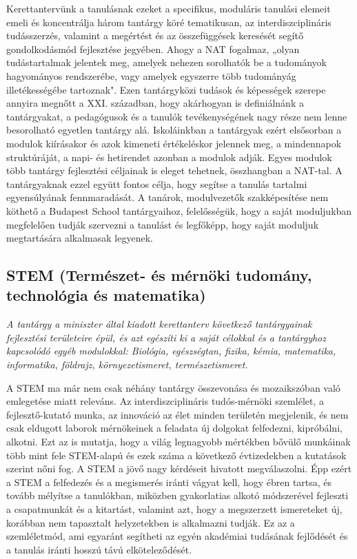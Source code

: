 Kerettantervünk a tanulásnak ezeket a specifikus, moduláris tanulási elemeit emeli és koncentrálja három tantárgy köré tematikusan, az interdiszciplináris tudásszerzés, valamint a megértést és az összefüggések keresését segítő gondolkodásmód fejlesztése jegyében. Ahogy a NAT fogalmaz, „olyan tudástartalmak jelentek meg, amelyek nehezen sorolhatók be a tudományok hagyományos rendszerébe, vagy amelyek egyszerre több tudományág illetékességébe tartoznak". Ezen tantárgyközi tudások és képességek szerepe annyira megnőtt a XXI. században, hogy akárhogyan is definiálnánk a tantárgyakat, a pedagógusok és a tanulók tevékenységének nagy része nem lenne besorolható egyetlen tantárgy alá. Iskoláinkban a tantárgyak ezért elsősorban a modulok kiírásakor és azok kimeneti értékeléskor jelennek meg, a mindennapok struktúráját, a napi- és hetirendet azonban a modulok adják. Egyes modulok több tantárgy fejlesztési céljainak is eleget tehetnek, összhangban a NAT-tal. A tantárgyaknak ezzel együtt fontos célja, hogy segítse a tanulás tartalmi egyensúlyának fennmaradását. A tanárok, modulvezetők szakképesítése nem köthető a Budapest School tantárgyaihoz, felelősségük, hogy a saját moduljukban megfelelően tudják szervezni a tanulást és legfőképp, hogy saját moduljuk megtartására alkalmasak legyenek.

\subsection[STEM]{STEM  (Természet- és mérnöki  tudomány, technológia és matematika)}
\emph{A tantárgy a miniszter által kiadott kerettanterv következő tantárgyainak fejlesztési területeire épül, és azt egészíti ki a saját célokkal és a tantárgyhoz kapcsolódó egyéb modulokkal:
Biológia, egészségtan, fizika, kémia, matematika, informatika, földrajz, környezetismeret, természetismeret.}


A STEM ma már nem csak néhány tantárgy összevonása és  mozaikszóban való emlegetése miatt releváns. Az interdiszciplináris tudós-mérnöki szemlélet, a fejlesztő-kutató munka, az innováció az élet minden területén megjelenik, és nem csak eldugott laborok mérnökeinek a feladata új dolgokat felfedezni, kipróbálni, alkotni. Ezt az is mutatja, hogy a világ legnagyobb mértékben bővülő munkáinak több mint fele STEM-alapú és ezek száma a következő évtizedekben a kutatások szerint nőni fog. A STEM a jövő nagy kérdéseit hivatott megválaszolni. Épp ezért a STEM a felfedezés és a megismerés iránti vágyat kell, hogy ébren tartsa, és tovább mélyítse a tanulókban, miközben gyakorlatias alkotó módszerével fejleszti a csapatmunkát és a kitartást, valamint azt, hogy a megszerzett ismereteket új, korábban nem tapasztalt helyzetekben is alkalmazni tudják. Ez az a szemléletmód, ami egyaránt segítheti az egyén akadémiai tudásának fejlődését és a tanulás iránti hosszú távú elköteleződését.

